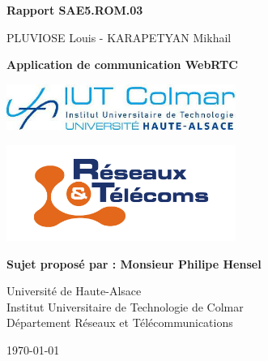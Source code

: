 \documentclass[12pt, a4paper, oneside]{Thesis}
\begin{document}
\author{PLUVIOSE Louis - KARAPETYAN Mikhail}

\begin{center}
{\LARGE \textbf{Rapport SAE5.ROM.03}}

\vspace{1cm}

{\Large {PLUVIOSE Louis - KARAPETYAN Mikhail}}

\vspace{1cm}

{\LARGE \textbf{Application de communication WebRTC}}

\vspace{2cm}

\includegraphics[width=7.5cm]{images/logo-iut-colmar.jpg}

\vspace{0.5cm}

\includegraphics[width=7.5cm]{images/logo-but-rt.png}

\vspace{2cm}

\textbf{Sujet proposé par : Monsieur Philipe Hensel} \\

\vspace{1cm}

Université de Haute-Alsace \\
Institut Universitaire de Technologie de Colmar \\
Département Réseaux et Télécommunications \\

\vspace{3cm}

{\large \mydate\today}

\end{center}

\newpage

\tableofcontents

\lstlistoflistings

\listoffigures
\end{document}
